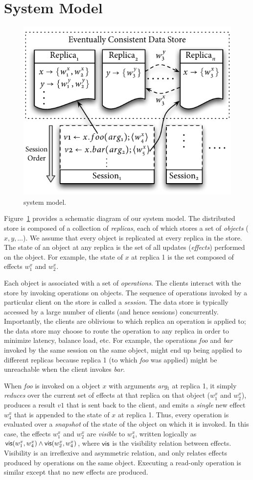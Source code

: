 \section{System Model}
\label{q_sec:sysmod}

\begin{figure}[t]
\centering
\includegraphics[width=0.5\columnwidth]{Figures/SystemModel}
\caption{\quelea system model.}
\label{fig:sysmod}
\end{figure}

Figure~\ref{fig:sysmod} provides a schematic diagram of our system model. The
distributed store is composed of a collection of \emph{replicas}, each of which
stores a set of \emph{objects} ($x,y,\ldots$). We assume that every object is
replicated at every replica in the store. The state of an object at any replica
is the set of all updates (\emph{effects}) performed on the object. For
example, the state of $x$ at replica 1 is the set composed of effects $w^x_1$
and $w^x_2$.

Each object is associated with a set of \emph{operations}. The clients interact
with the store by invoking operations on objects. The sequence of operations
invoked by a particular client on the store is called a \emph{session}. The
data store is typically accessed by a large number of clients (and hence
sessions) concurrently. Importantly, the clients are oblivious to which replica
an operation is applied to; the data store may choose to route the operation to
any replica in order to minimize latency, balance load, etc. For example, the
operations \emph{foo} and \emph{bar} invoked by the same session on the same
object, might end up being applied to different replicas because replica 1 (to
which \emph{foo} was applied) might be unreachable when the client invokes
\emph{bar}.

When \emph{foo} is invoked on a object $x$ with arguments \emph{arg}$_1$ at
replica 1, it simply \emph{reduces} over the current set of effects at that
replica on that object ($w^x_1$ and $w^x_2$), produces a result $v1$ that is
sent back to the client, and emits a \emph{single} new effect $w^x_4$ that is
appended to the state of $x$ at replica 1. Thus, every operation is evaluated
over a \emph{snapshot} of the state of the object on which it is invoked. In
this case, the effects $w^x_1$ and $w^x_2$ are \emph{visible} to $w^x_4$,
written logically as ${\normalfont \textsf{vis}(w^x_1,w^x_4)} \wedge {\normalfont \textsf{vis}(w^x_2,w^x_4)}$, where
${\normalfont \textsf{vis}}$ is the visibility relation between effects. Visibility is an
irreflexive and asymmetric relation, and only relates effects produced by
operations on the same object. Executing a read-only operation is similar
except that no new effects are produced.


